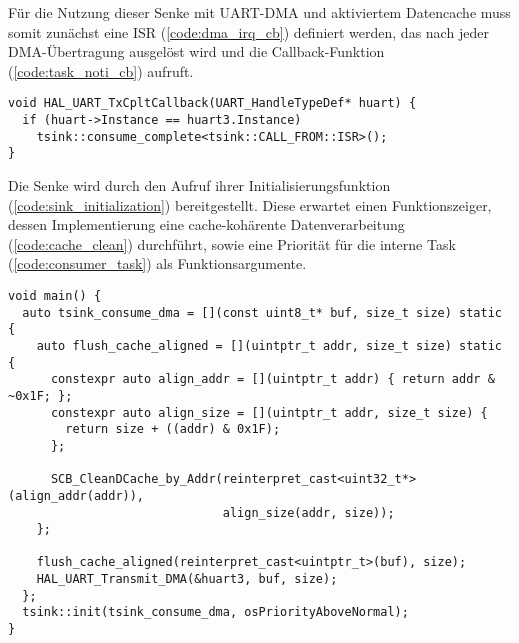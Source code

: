 Für die Nutzung dieser Senke mit UART-DMA und aktiviertem Datencache muss somit
zunächst eine ISR (\ref{code:dma_irq_cb}) definiert werden, das nach jeder
DMA-Übertragung ausgelöst wird und die Callback-Funktion
(\ref{code:task_noti_cb}) aufruft.

\begin{code}
\begin{verbatim}
void HAL_UART_TxCpltCallback(UART_HandleTypeDef* huart) {
  if (huart->Instance == huart3.Instance)
    tsink::consume_complete<tsink::CALL_FROM::ISR>();
}
\end{verbatim}
    \label{code:dma_irq_cb}
\end{code}

Die Senke wird durch den Aufruf ihrer Initialisierungsfunktion
(\ref{code:sink_initialization}) bereitgestellt. Diese erwartet einen
Funktionszeiger, dessen Implementierung eine cache-kohärente Datenverarbeitung
(\ref{code:cache_clean}) durchführt, sowie eine Priorität für die interne Task
(\ref{code:consumer_task}) als Funktionsargumente.

\begin{code}
\begin{verbatim}
void main() {
  auto tsink_consume_dma = [](const uint8_t* buf, size_t size) static {
    auto flush_cache_aligned = [](uintptr_t addr, size_t size) static {
      constexpr auto align_addr = [](uintptr_t addr) { return addr & ~0x1F; };
      constexpr auto align_size = [](uintptr_t addr, size_t size) {
        return size + ((addr) & 0x1F);
      };

      SCB_CleanDCache_by_Addr(reinterpret_cast<uint32_t*>(align_addr(addr)),
                              align_size(addr, size));
    };

    flush_cache_aligned(reinterpret_cast<uintptr_t>(buf), size);
    HAL_UART_Transmit_DMA(&huart3, buf, size);
  };
  tsink::init(tsink_consume_dma, osPriorityAboveNormal);
}
\end{verbatim}
    \label{code:sink_initialization}
\end{code}

